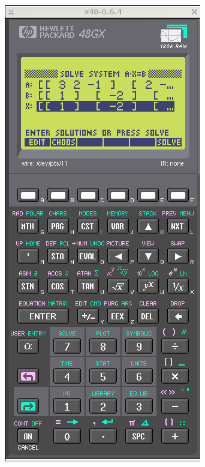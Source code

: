 \documentclass[11pt]{article}
\begin{document}
\includegraphics[scale,height=0.33\textheight]{20180422143232-linear01-p5.png}
~
\end{document}
